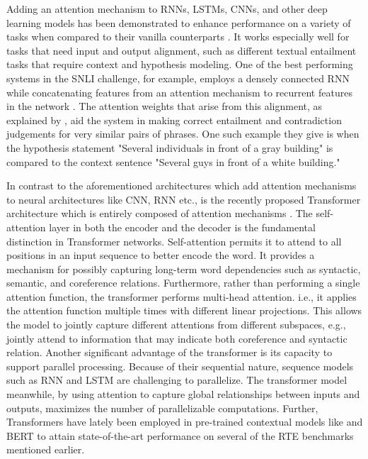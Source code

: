 Adding an attention mechanism to RNNs, LSTMs, CNNs, and other deep learning models has been demonstrated to enhance performance on a variety of tasks when compared to their vanilla counterparts \citep{kim2019semantic}. It works especially well for tasks that need input and output alignment, such as different textual entailment tasks that require context and hypothesis modeling. One of the best performing systems in the SNLI challenge, for example, employs a densely connected RNN while concatenating features from an attention mechanism to recurrent features in the network \citep{kim2019semantic}. The attention weights that arise from this alignment, as explained by \citep{kim2019semantic}, aid the system in making correct entailment and contradiction judgements for very similar pairs of phrases. One such example they give is when the hypothesis statement "Several individuals in front of a gray building" is compared to the context sentence "Several guys in front of a white building."

In contrast to the aforementioned architectures which add attention mechanisms to neural architectures like CNN, RNN etc., is the recently proposed Transformer architecture which is entirely composed of attention mechanisms \citep{vaswani2017attention}. The self-attention layer in both the encoder and the decoder is the fundamental distinction in Transformer networks. Self-attention permits it to attend to all positions in an input sequence to better encode the word. It provides a mechanism for possibly capturing long-term word dependencies such as syntactic, semantic, and coreference relations. Furthermore, rather than performing a single attention function, the transformer performs multi-head attention. i.e., it applies the attention function multiple times with different linear projections. This allows the model to jointly capture different attentions from different subspaces, e.g., jointly attend to information that may indicate both coreference and syntactic relation. Another significant advantage of the transformer is its capacity to support parallel processing. Because of their sequential nature, sequence models such as RNN and LSTM are challenging to parallelize. The transformer model meanwhile, by using attention to capture global relationships between inputs and outputs, maximizes the number of parallelizable computations. Further, Transformers have lately been employed in pre-trained contextual models like \citep{radford2018improving} and BERT  \citep{devlin2018bert} to attain state-of-the-art performance on several of the RTE benchmarks mentioned earlier.